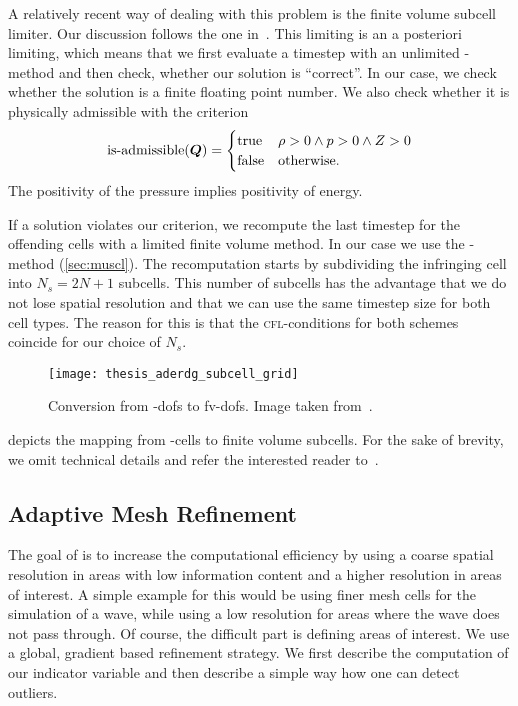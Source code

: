A relatively recent way of dealing with this problem is the finite volume subcell limiter.
Our discussion follows the one in~\cite{dumbser2016simple}.
This limiting is an a posteriori limiting, which means that we first evaluate a timestep with an unlimited \aderdg{}-method and then check, whether our solution is \enquote{correct}.
In our case, we check whether the solution is a finite floating point number.
We also check whether it is physically admissible with the criterion
\begin{equation}
  \label{eq:limiting-physical}
  \operatorname{is-admissible}(\bm{Q}) =
  \begin{cases}
    \text{true} & \rho > 0 \land p > 0 \land Z > 0 \\
    \text{false} & \text{otherwise}.
  \end{cases}
\end{equation}
The positivity of the pressure implies positivity of energy.

If a solution violates our criterion, we recompute the last timestep for the offending cells with a limited finite volume method.
In our case we use the \muscl{}-method (\cref{sec:muscl}).
The recomputation starts by subdividing the infringing cell into $N_s = 2N + 1$ subcells.
This number of subcells has the advantage that we do not lose spatial resolution and that we can use the same timestep size for both cell types.
The reason for this is that the \textsc{cfl}-conditions for both schemes  coincide for our choice of $N_s$.
\begin{figure}[htb]
  \centering
  \texttt{[image: thesis\_aderdg\_subcell\_grid]}
  \caption{\label{fig:limiting-subcells}Conversion from \dg{}-dofs to fv-dofs. Image taken from~\cite{dumbser2018conformal}. }
\end{figure}

 depicts the mapping from \dg{}-cells to finite volume subcells.
For the sake of brevity, we omit technical details and refer the interested reader to~\cite{dumbser2016simple}.

\subsection{Adaptive Mesh Refinement}\label{sec:amr}
The goal of \amr{} is to increase the computational efficiency by using a coarse spatial resolution in areas with low information content and a higher resolution in areas of interest.
A simple example for this would be using finer mesh cells for the simulation of a wave, while using a low resolution for areas where the wave does not pass through.
Of course, the difficult part is defining areas of interest.
We use a global, gradient based refinement strategy.
We first describe the computation of our indicator variable and then describe a simple way how one can detect outliers.

